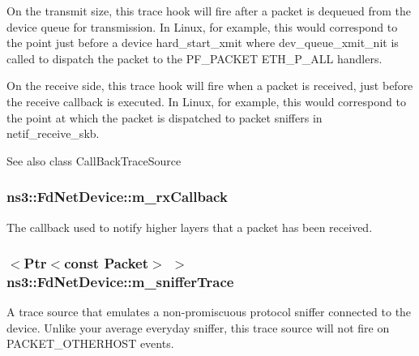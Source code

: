 On the transmit size, this trace hook will fire after a packet is dequeued from the device queue for transmission. In Linux, for example, this would correspond to the point just before a device hard\+\_\+start\+\_\+xmit where dev\+\_\+queue\+\_\+xmit\+\_\+nit is called to dispatch the packet to the P\+F\+\_\+\+P\+A\+C\+K\+ET E\+T\+H\+\_\+\+P\+\_\+\+A\+LL handlers.

On the receive side, this trace hook will fire when a packet is received, just before the receive callback is executed. In Linux, for example, this would correspond to the point at which the packet is dispatched to packet sniffers in netif\+\_\+receive\+\_\+skb.

\begin{DoxySeeAlso}{See also}
class Call\+Back\+Trace\+Source 
\end{DoxySeeAlso}
\subsubsection[{\texorpdfstring{m\+\_\+rx\+Callback}{m_rxCallback}}]{ ns3\+::\+Fd\+Net\+Device\+::m\+\_\+rx\+Callback\hspace{0.3cm}{\ttfamily [private]}}\hypertarget{classns3_1_1FdNetDevice_a5c3e9d04b053c707a4188f823a6bc2ab}{}\label{classns3_1_1FdNetDevice_a5c3e9d04b053c707a4188f823a6bc2ab}
The callback used to notify higher layers that a packet has been received. 
\subsubsection[{\texorpdfstring{m\+\_\+sniffer\+Trace}{m_snifferTrace}}]{$<${\bf Ptr}$<$const {\bf Packet}$>$ $>$ ns3\+::\+Fd\+Net\+Device\+::m\+\_\+sniffer\+Trace\hspace{0.3cm}{\ttfamily [private]}}\hypertarget{classns3_1_1FdNetDevice_a821080a2cc1253e22918e8fcedcfbe58}{}\label{classns3_1_1FdNetDevice_a821080a2cc1253e22918e8fcedcfbe58}
A trace source that emulates a non-\/promiscuous protocol sniffer connected to the device. Unlike your average everyday sniffer, this trace source will not fire on P\+A\+C\+K\+E\+T\+\_\+\+O\+T\+H\+E\+R\+H\+O\+ST events.

